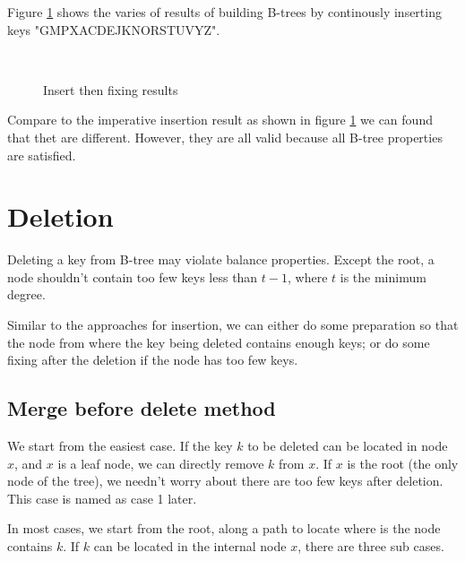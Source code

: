 \documentclass{article}
\begin{document}
Figure \ref{fig:btree-insert-fp} shows the varies of results of building B-trees
by continously inserting keys "GMPXACDEJKNORSTUVYZ".

\begin{figure}[htbp]
  \centering
   \\
    \caption{Insert then fixing results} \label{fig:btree-insert-fp}
\end{figure}

Compare to the imperative insertion result
as shown in figure \ref{fig:btree-insert-fp}
we can found that thet are different. However, they are all valid
because all B-tree properties
are satisfied.


\section{Deletion}

Deleting a key from
B-tree may violate balance properties. Except the root, a node shouldn't
contain too few keys less than $t-1$, where $t$ is the
minimum degree.

Similar to the approaches for insertion, we can either do some preparation
so that the node from where the key being deleted contains enough
keys; or do some fixing after the deletion if the node has too few keys.


\subsection{Merge before delete method}

We start from the easiest case. If the key $k$ to be deleted
can be located in node $x$, and $x$ is a leaf node,
we can directly remove $k$ from $x$. If $x$ is the root (the only
node of the tree), we needn't worry about there are too few
keys after deletion. This case is named as case 1 later.

In most cases, we start from the root, along a path to locate
where is the node contains $k$. If $k$ can be located in the
internal node $x$, there are three sub cases.
\end{document}
